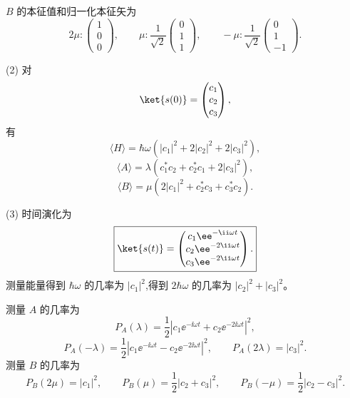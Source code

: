 \begin{question}
\begin{solution}
$B$ 的本征值和归一化本征矢为
\[
2\mu:\begin{pmatrix}1\\0\\0\end{pmatrix},
\qquad
\mu:\frac1{\sqrt2}\begin{pmatrix}0\\1\\1\end{pmatrix},
\qquad
-\mu:\frac1{\sqrt2}\begin{pmatrix}0\\1\\-1\end{pmatrix}.
\]

(2) 对
\[
\ket{s(0)}=\begin{pmatrix}c_1\\c_2\\c_3\end{pmatrix},
\]
有
\[
\langle H\rangle=\hbar\omega(|c_1|^2+2|c_2|^2+2|c_3|^2),
\]
\[
\langle A\rangle=\lambda(c_1^*c_2+c_2^*c_1+2|c_3|^2),
\]
\[
\langle B\rangle=\mu(2|c_1|^2+c_2^*c_3+c_3^*c_2).
\]

(3) 时间演化为
\[
\boxed{\ket{s(t)}=\begin{pmatrix}
c_1\ee^{-\ii\omega t}\\
c_2\ee^{-2\ii\omega t}\\
c_3\ee^{-2\ii\omega t}
\end{pmatrix}.}
\]
测量能量得到 $\hbar\omega$ 的几率为 $|c_1|^2$,得到 $2\hbar\omega$ 的几率为 $|c_2|^2+|c_3|^2$。

测量 $A$ 的几率为
\[
P_A(\lambda)=\frac12\left|c_1\ee^{-\ii\omega t}+c_2\ee^{-2\ii\omega t}\right|^2,
\]
\[
P_A(-\lambda)=\frac12\left|c_1\ee^{-\ii\omega t}-c_2\ee^{-2\ii\omega t}\right|^2,
\qquad
P_A(2\lambda)=|c_3|^2.
\]
测量 $B$ 的几率为
\[
P_B(2\mu)=|c_1|^2,
\qquad
P_B(\mu)=\frac12|c_2+c_3|^2,
\qquad
P_B(-\mu)=\frac12|c_2-c_3|^2.
\]
\end{solution}
\end{question}

